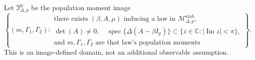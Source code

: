 Let \(\mathfrak I_{\Delta,p}^{\mathrm{fr}}\) be the population moment image
\[
 \left\{(m,\Gamma_1,\Gamma_2):\begin{array}{l}
 \text{there exists }(\beta,A,\mu)\text{ inducing a law in }\mathcal M_{\Delta,p}^{\mathrm{stab}},\\
 \det(A)\neq0,\quad
 \operatorname{spec}\{\Delta(A-\beta I_p)\}\subset\{z\in\mathbb C:|\operatorname{Im}z|<\pi\},\\
 \text{and }m,\Gamma_1,\Gamma_2\text{ are that law's population moments}
 \end{array}\right\}.
\]
This is an image-defined domain, not an additional observable assumption.